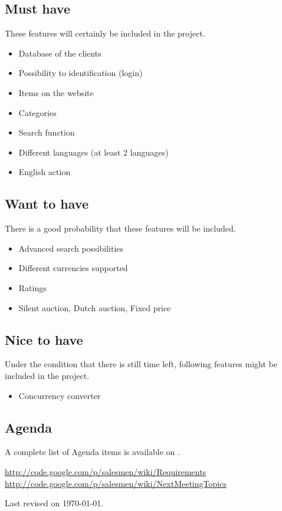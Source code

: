 \documentclass[a4paper, 12pt]{article}
\begin{document}
	\subsection{Must have}
	These features will certainly be included in the project.
		\begin{itemize}
			\item Database of the clients
			\item Possibility to identification (login)
			\item Items on the website
			\item Categories
			\item Search function
			\item Different languages (at least 2 languages)
			\item English action
		\end{itemize}
	
	\subsection{Want to have}
	There is a good probability that these features will be included.
		\begin{itemize}
			\item Advanced search possibilities
			\item Different currencies supported
			\item Ratings
			\item Silent auction, Dutch auction, Fixed price 
		\end{itemize}
		
	\subsection{Nice to have}
	Under the condition that there is still time left, following features might be included in the project.
		\begin{itemize}
			\item Concurrency converter
		\end{itemize}
	\subsection{Agenda}
	A complete list of Agenda items is available on \cite{site2}.

			
		
	
	
	\begin{thebibliography}{99}
		\href{http://code.google.com/p/salesmen/wiki/Requirements}{http://code.google.com/p/salesmen/wiki/Requirements}
		\href{http://code.google.com/p/salesmen/wiki/NextMeetingTopics}{http://code.google.com/p/salesmen/wiki/NextMeetingTopics}

		
	\end{thebibliography}	
	
	\begin{center}
	 	Last revised on \today.
	\end{center}
	
	
\end{document}
